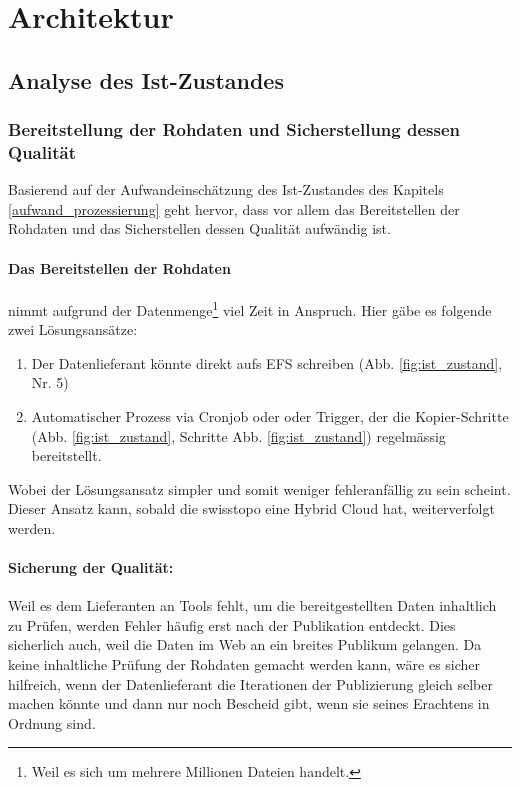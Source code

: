 \section{Architektur}

\subsection{Analyse des Ist-Zustandes}
\subsubsection{Bereitstellung der Rohdaten und Sicherstellung dessen Qualität}
Basierend auf der Aufwandeinschätzung des Ist-Zustandes des Kapitels \ref{aufwand_prozessierung} geht hervor, dass vor allem das Bereitstellen der Rohdaten und das Sicherstellen dessen Qualität aufwändig ist. 

\paragraph{Das Bereitstellen der Rohdaten} nimmt aufgrund der Datenmenge\footnote{Weil es sich um mehrere Millionen Dateien handelt.} viel Zeit in Anspruch. Hier gäbe es folgende zwei Lösungsansätze:
\begin{enumerate}
\item Der Datenlieferant könnte direkt aufs EFS schreiben (Abb. \ref{fig:ist_zustand}, Nr. 5)
\item Automatischer Prozess via Cronjob oder oder Trigger, der die Kopier-Schritte (Abb. \ref{fig:ist_zustand}, Schritte Abb. \ref{fig:ist_zustand}) regelmässig bereitstellt.
\end{enumerate}

Wobei der Lösungsansatz simpler und somit weniger fehleranfällig zu sein scheint. Dieser Ansatz kann, sobald die swisstopo eine Hybrid Cloud hat, weiterverfolgt werden.

\paragraph{Sicherung der Qualität:} Weil es dem Lieferanten an Tools fehlt, um die bereitgestellten Daten inhaltlich zu Prüfen, werden Fehler 
häufig erst nach der Publikation entdeckt. Dies sicherlich auch, weil die Daten im Web an ein breites Publikum gelangen. Da keine inhaltliche Prüfung der Rohdaten gemacht werden kann, wäre es sicher hilfreich, wenn der Datenlieferant die Iterationen der Publizierung gleich selber machen könnte und dann nur noch Bescheid gibt, wenn sie seines Erachtens in Ordnung sind.

